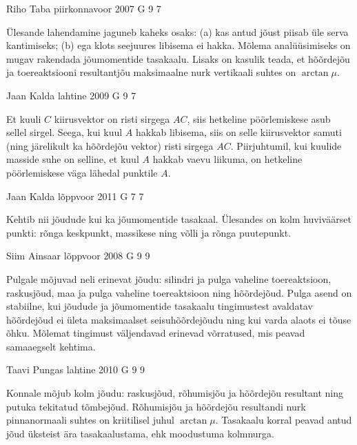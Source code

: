 \documentclass[11pt, twoside]{article}
\begin{document}
{%
{Riho Taba} %
{piirkonnavoor} %
{2007} %
{G 9} %
{7} %
{

\ifHint
Ülesande lahendamine jaguneb kaheks osaks: (a) kas antud jõust piisab üle serva kantimiseks; (b) ega klots seejuures libisema ei hakka. Mõlema analüüsimiseks on mugav rakendada jõumomentide tasakaalu. Lisaks on kasulik teada, et hõõrdejõu ja toereaktsiooni resultantjõu maksimaalne nurk vertikaali suhtes on $\arctan \mu$.
\fi
}

{Jaan Kalda} %
{lahtine} %
{2009} %
{G 9} %
{7} %
{

\ifHint
Et kuuli $C$ kiirusvektor on risti sirgega $AC$, siis hetkeline pöörlemiskese asub sellel sirgel. Seega, kui kuul $A$ hakkab libisema, siis on selle kiirusvektor samuti (ning järelikult ka hõõrdejõu vektor) risti sirgega $AC$. Piirjuhtumil, kui kuulide masside suhe on selline, et kuul $A$ hakkab vaevu liikuma, on hetkeline pöörlemiskese väga lähedal punktile $A$.
\fi
}

{Jaan Kalda} %
{lõppvoor} %
{2011} %
{G 7} %
{7} %
{

\ifHint
Kehtib nii jõudude kui ka jõumomentide tasakaal. Ülesandes on kolm huviväärset punkti: rõnga keskpunkt, massikese ning võlli ja rõnga puutepunkt.
\fi
}

{Siim Ainsaar} %
{lõppvoor} %
{2008} %
{G 9} %
{9} %
{

\ifHint
Pulgale mõjuvad neli erinevat jõudu: silindri ja pulga vaheline toereaktsioon, raskusjõud, maa ja pulga vaheline toereaktsioon ning hõõrdejõud. Pulga asend on stabiilne, kui jõudude ja jõumomentide tasakaalu tingimustest avaldatav hõõrdejõud ei ületa maksimaalset seisuhõõrdejõudu ning kui varda alaots ei tõuse õhku. Mõlemat tingimust väljendavad erinevad võrratused, mis peavad samaaegselt kehtima.
\fi
}

{Taavi Pungas} %
{lahtine} %
{2010} %
{G 9} %
{9} %
{

\ifHint
Konnale mõjub kolm jõudu: raskusjõud, rõhumisjõu ja hõõrdejõu resultant ning putuka tekitatud tõmbejõud. Rõhumisjõu ja hõõrdejõu resultandi nurk pinnanormaali suhtes on kriitilisel juhul $\arctan \mu$. Tasakaalu korral peavad antud jõud üksteist ära tasakaalustama, ehk moodustuma kolmnurga.
\fi
}

}
\end{document}

